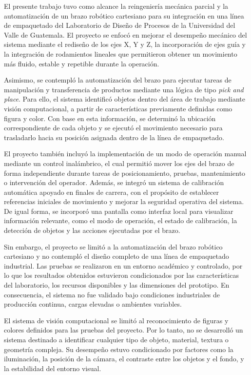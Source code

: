 El presente trabajo tuvo como alcance la reingeniería mecánica parcial y la automatización de un brazo robótico cartesiano para su integración en una línea de empaquetado del Laboratorio de Diseño de Procesos de la Universidad del Valle de Guatemala. El proyecto se enfocó en mejorar el desempeño mecánico del sistema mediante el rediseño de los ejes X, Y y Z, la incorporación de ejes guía y la integración de rodamientos lineales que permitieron obtener un movimiento más fluido, estable y repetible durante la operación.

Asimismo, se contempló la automatización del brazo para ejecutar tareas de manipulación y transferencia de productos mediante una lógica de tipo \textit{pick and place}. Para ello, el sistema identificó objetos dentro del área de trabajo mediante visión computacional, a partir de características previamente definidas como figura y color. Con base en esta información, se determinó la ubicación correspondiente de cada objeto y se ejecutó el movimiento necesario para trasladarlo hacia su posición asignada dentro de la línea de empaquetado.

El proyecto también incluyó la implementación de un modo de operación manual mediante un control inalámbrico, el cual permitió mover los ejes del brazo de forma independiente durante tareas de posicionamiento, pruebas, mantenimiento o intervención del operador. Además, se integró un sistema de calibración automática apoyado en finales de carrera, con el propósito de establecer referencias iniciales de movimiento y mejorar la seguridad operativa del sistema. De igual forma, se incorporó una pantalla como interfaz local para visualizar información relevante, como el modo de operación, el estado de calibración, la detección de objetos y las acciones ejecutadas por el brazo.

Sin embargo, el proyecto se limitó a la automatización del brazo robótico cartesiano y no contempló el diseño completo de una línea de empaquetado industrial. Las pruebas se realizaron en un entorno académico y controlado, por lo que los resultados obtenidos estuvieron condicionados por las características del laboratorio, los recursos disponibles y las dimensiones del prototipo. En consecuencia, el sistema no fue validado bajo condiciones industriales de producción continua, cargas elevadas o ambientes variables.

El sistema de visión computacional se limitó al reconocimiento de figuras y colores definidos para las pruebas del proyecto. Por lo tanto, no se desarrolló un sistema destinado a identificar cualquier tipo de objeto, material, textura o geometría compleja. Su desempeño estuvo condicionado por factores como la iluminación, la posición de la cámara, el contraste entre los objetos y el fondo, y la estabilidad del entorno visual.

